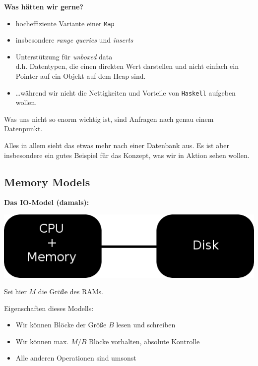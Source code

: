 \documentclass{beamer}
\begin{document}
\begin{frame}
\textbf{Was hätten wir gerne?}
\pause
\bigskip
\begin{itemize}
\item hocheffiziente Variante einer \texttt{Map}\pause
\item insbesondere \emph{range queries} und \emph{inserts}\pause
\item Unterstützung für \emph{unboxed} data\\
      d.h. Datentypen, die einen direkten Wert darstellen und nicht einfach ein Pointer auf ein Objekt auf dem Heap sind.\pause
\item \dots während wir nicht die Nettigkeiten und Vorteile von \texttt{Haskell} aufgeben wollen.\pause
\end{itemize}

Was uns nicht so enorm wichtig ist, sind Anfragen nach genau einem Datenpunkt.\smallskip

Alles in allem sieht das etwas mehr nach einer Datenbank aus. Es ist aber insbesondere ein gutes Beispiel für das Konzept, was wir in Aktion sehen wollen.

\end{frame}
\subsection{Memory Models}

\begin{frame}
\textbf{Das IO-Model (damals):}

\begin{center}
\includegraphics[scale=0.375]{model1.png} 
\end{center}
Sei hier $M$ die Größe des RAMs.\smallskip\smallskip
\pause

Eigenschaften dieses Modells:
\begin{itemize}
\item Wir können Blöcke der Größe $B$ lesen und schreiben\pause
\item Wir können max. $M/B$ Blöcke vorhalten, absolute Kontrolle\pause
\item Alle anderen Operationen sind \glqq umsonst\grqq
\end{itemize}
\end{frame}
\end{document}
